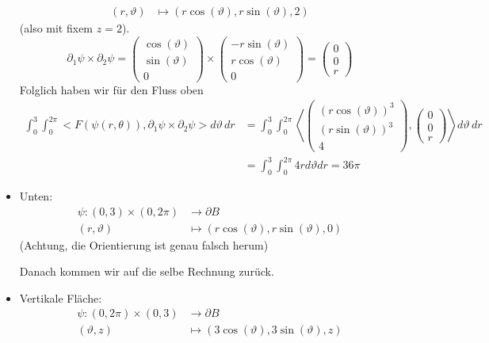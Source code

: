 \documentclass[main.tex]{subfiles}
\begin{document}
\begin{Beispiel}[$B = \{(x,y,z) \in \R^3 \mid x^2 + y^2 \leq 9 \land 0 \leq z \leq 2\}$ (ein Zylinder)]
\begin{itemize}
$$\begin{aligned}
        (r, \vartheta) & \mapsto (r \cos(\vartheta),r \sin(\vartheta),2)
      \end{aligned}$$
      (also mit fixem $z = 2$).
      $$\partial_1 \psi \times \partial_2 \psi = \begin{pmatrix}
        \cos(\vartheta) \\ \sin(\vartheta) \\ 0
      \end{pmatrix} \times \begin{pmatrix}
        -r \sin(\vartheta) \\ r \cos(\vartheta) \\ 0
      \end{pmatrix} = \begin{pmatrix}
        0 \\ 0 \\ r
      \end{pmatrix}$$
      Folglich haben wir für den Fluss oben
      $$\begin{aligned}
        \int_0^3 \int_0^{2\pi} <F(\psi(r,\theta)),\partial_1 \psi \times \partial_2 \psi>d\vartheta \, dr & =\int_0^3 \int_0^{2\pi} \left< \begin{pmatrix}
          (r \cos(\vartheta))^3 \\ (r \sin(\vartheta))^3 \\ 4
        \end{pmatrix},\begin{pmatrix}
          0 \\ 0 \\ r
        \end{pmatrix} \right> d\vartheta \, dr \\
        & = \int_0^3 \int_0^{2\pi} 4r d \vartheta dr = 36 \pi
      \end{aligned}$$
    \item Unten:
      $$\begin{aligned}
        \psi: (0,3) \times (0,2 \pi) & \to \partial B \\
        (r, \vartheta) & \mapsto (r \cos(\vartheta),r \sin(\vartheta),0)
      \end{aligned}$$
      (Achtung, die Orientierung ist genau falsch herum)

      Danach kommen wir auf die selbe Rechnung zurück.
    \item Vertikale Fläche:
      $$\begin{aligned}
        \psi: (0,2\pi) \times (0,3) & \to \partial B \\
        (\vartheta, z) & \mapsto (3 \cos(\vartheta),3 \sin(\vartheta), z)
      \end{aligned}$$


\end{itemize}
\end{Beispiel}
\end{document}
